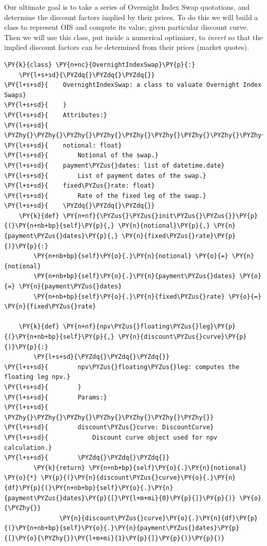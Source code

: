 Our ultimate goal is to take a series of Overnight Index Swap
quotations, and determine the discount factors implied by their prices.
To do this we will build a class to represent OIS and compute its value,
given particular discount curve. Then we will use this class, put inside
a numerical optimizer, to \emph{invert} so that the implied discount
factors can be determined from their prices (market quotes).

\begin{tcolorbox}[breakable, size=fbox, boxrule=1pt, pad at break*=1mm,colback=cellbackground, colframe=cellborder]
\begin{Verbatim}[commandchars=\\\{\}]
\PY{k}{class} \PY{n+nc}{OvernightIndexSwap}\PY{p}{:}
    \PY{l+s+sd}{\PYZdq{}\PYZdq{}\PYZdq{}}
\PY{l+s+sd}{    OvernightIndexSwap: a class to valuate Overnight Index Swaps}
\PY{l+s+sd}{    }
\PY{l+s+sd}{    Attributes:}
\PY{l+s+sd}{    \PYZhy{}\PYZhy{}\PYZhy{}\PYZhy{}\PYZhy{}\PYZhy{}\PYZhy{}\PYZhy{}\PYZhy{}\PYZhy{}\PYZhy{}}
\PY{l+s+sd}{    notional: float}
\PY{l+s+sd}{        Notional of the swap.}
\PY{l+s+sd}{    payment\PYZus{}dates: list of datetime.date}
\PY{l+s+sd}{        List of payment dates of the swap.}
\PY{l+s+sd}{    fixed\PYZus{}rate: float}
\PY{l+s+sd}{        Rate of the fixed leg of the swap.}
\PY{l+s+sd}{    \PYZdq{}\PYZdq{}\PYZdq{}}
    \PY{k}{def} \PY{n+nf}{\PYZus{}\PYZus{}init\PYZus{}\PYZus{}}\PY{p}{(}\PY{n+nb+bp}{self}\PY{p}{,} \PY{n}{notional}\PY{p}{,} \PY{n}{payment\PYZus{}dates}\PY{p}{,} \PY{n}{fixed\PYZus{}rate}\PY{p}{)}\PY{p}{:}
        \PY{n+nb+bp}{self}\PY{o}{.}\PY{n}{notional} \PY{o}{=} \PY{n}{notional}
        \PY{n+nb+bp}{self}\PY{o}{.}\PY{n}{payment\PYZus{}dates} \PY{o}{=} \PY{n}{payment\PYZus{}dates}
        \PY{n+nb+bp}{self}\PY{o}{.}\PY{n}{fixed\PYZus{}rate} \PY{o}{=} \PY{n}{fixed\PYZus{}rate}

    \PY{k}{def} \PY{n+nf}{npv\PYZus{}floating\PYZus{}leg}\PY{p}{(}\PY{n+nb+bp}{self}\PY{p}{,} \PY{n}{discount\PYZus{}curve}\PY{p}{)}\PY{p}{:}
        \PY{l+s+sd}{\PYZdq{}\PYZdq{}\PYZdq{}}
\PY{l+s+sd}{        npv\PYZus{}floating\PYZus{}leg: computes the floating leg npv.}
\PY{l+s+sd}{        }
\PY{l+s+sd}{        Params:}
\PY{l+s+sd}{        \PYZhy{}\PYZhy{}\PYZhy{}\PYZhy{}\PYZhy{}\PYZhy{}\PYZhy{}}
\PY{l+s+sd}{        discount\PYZus{}curve: DiscountCurve}
\PY{l+s+sd}{            Discount curve object used for npv calculation.}
\PY{l+s+sd}{        \PYZdq{}\PYZdq{}\PYZdq{}}
        \PY{k}{return} \PY{n+nb+bp}{self}\PY{o}{.}\PY{n}{notional} \PY{o}{*} \PY{p}{(}\PY{n}{discount\PYZus{}curve}\PY{o}{.}\PY{n}{df}\PY{p}{(}\PY{n+nb+bp}{self}\PY{o}{.}\PY{n}{payment\PYZus{}dates}\PY{p}{[}\PY{l+m+mi}{0}\PY{p}{]}\PY{p}{)} \PY{o}{\PYZhy{}}
               \PY{n}{discount\PYZus{}curve}\PY{o}{.}\PY{n}{df}\PY{p}{(}\PY{n+nb+bp}{self}\PY{o}{.}\PY{n}{payment\PYZus{}dates}\PY{p}{[}\PY{o}{\PYZhy{}}\PY{l+m+mi}{1}\PY{p}{]}\PY{p}{)}\PY{p}{)}


\end{Verbatim}
\end{tcolorbox}
